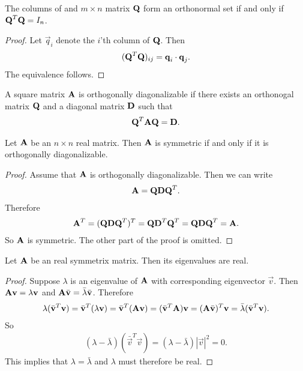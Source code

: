 \documentclass{memoir}
\begin{document}
\begin{theorem}
    The columns of and $m \times n$ matrix $\boldsymbol{\mathbf{Q}}$ form an orthonormal set if and only if $\boldsymbol{\mathbf{Q}}^T \boldsymbol{\mathbf{Q}}=I_n$.
\end{theorem}
\begin{proof}
    Let $\vec{q}_i$ denote the $i$'th column of $\boldsymbol{\mathbf{Q}}$. Then
    \begin{align*}
        (\boldsymbol{\mathbf{Q}}^T \boldsymbol{\mathbf{Q}})_{ij} = \boldsymbol{\mathbf{q}}_i \cdot \boldsymbol{\mathbf{q}}_j.
    \end{align*}
    The equivalence follows.
\end{proof}

\begin{definition}
    A square matrix $\boldsymbol{\mathbf{A}}$ is orthogonally diagonalizable if there exists an orthonogal matrix $\boldsymbol{\mathbf{Q}}$ and a diagonal matrix $\boldsymbol{\mathbf{D}}$ such that
    \begin{align*}
        \boldsymbol{\mathbf{Q}}^T \boldsymbol{\mathbf{A}} \boldsymbol{\mathbf{Q}} = \boldsymbol{\mathbf{D}}.
    \end{align*}
\end{definition}

\begin{theorem}
    Let $\boldsymbol{\mathbf{A}}$ be an $n \times n$ real matrix. Then $\boldsymbol{\mathbf{A}}$ is symmetric if and only if it is orthogonally diagonalizable.
\end{theorem}
\begin{proof}
    Assume that $\boldsymbol{\mathbf{A}}$ is orthogonally diagonalizable. Then we can write
    \begin{align*}
        \boldsymbol{\mathbf{A}} = \boldsymbol{\mathbf{Q}} \boldsymbol{\mathbf{D}} \boldsymbol{\mathbf{Q}}^T.
    \end{align*}
    Therefore
    \begin{align*}
        \boldsymbol{\mathbf{A}}^T = (\boldsymbol{\mathbf{Q}} \boldsymbol{\mathbf{D}} \boldsymbol{\mathbf{Q}}^T)^T = \boldsymbol{\mathbf{Q}} \boldsymbol{\mathbf{D}}^T \boldsymbol{\mathbf{Q}}^T = \boldsymbol{\mathbf{Q}} \boldsymbol{\mathbf{D}} \boldsymbol{\mathbf{Q}}^T = \boldsymbol{\mathbf{A}}.
    \end{align*}
    So $\boldsymbol{\mathbf{A}}$ is symmetric. The other part of the proof is omitted.
\end{proof}

\begin{theorem}
    Let $\boldsymbol{\mathbf{A}}$ be an real symmetrix matrix. Then its eigenvalues are real.
\end{theorem}
\begin{proof}
    Suppose $\lambda$ is an eigenvalue of $\boldsymbol{\mathbf{A}}$ with corresponding eigenvector $\vec{v}$. Then $\boldsymbol{\mathbf{A}} \boldsymbol{\mathbf{v}} = \lambda \boldsymbol{\mathbf{v}}$ and $\boldsymbol{\mathbf{A}} \bar{\boldsymbol{\mathbf{v}}} = \bar{\lambda} \bar{\boldsymbol{\mathbf{v}}}$. Therefore
    \begin{align*}
        \lambda (\bar{\boldsymbol{\mathbf{v}}}^T \boldsymbol{\mathbf{v}}) = \bar{\boldsymbol{\mathbf{v}}}^T (\lambda \boldsymbol{\mathbf{v}}) = \bar{\boldsymbol{\mathbf{v}}}^T (\boldsymbol{\mathbf{A}} \boldsymbol{\mathbf{v}}) = (\bar{\boldsymbol{\mathbf{v}}}^T \boldsymbol{\mathbf{A}}) \boldsymbol{\mathbf{v}} = (\boldsymbol{\mathbf{A}} \bar{\boldsymbol{\mathbf{v}}})^T \boldsymbol{\mathbf{v}} = \bar{\lambda} (\bar{\boldsymbol{\mathbf{v}}}^T \boldsymbol{\mathbf{v}}).
    \end{align*}
    So
    \begin{align*}
        (\lambda - \bar{\lambda})(\bar{\vec{v}}^T \vec{v}) = (\lambda - \bar{\lambda}) |\vec{v}|^2 = 0.
    \end{align*}
    This implies that $\lambda = \bar{\lambda}$ and $\lambda$ must therefore be real.
\end{proof}
\end{document}
